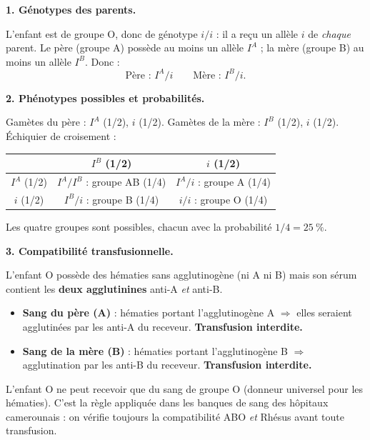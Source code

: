 \documentclass[11pt]{article}
\begin{document}
\begin{corrige}
\textbf{1. Génotypes des parents.}

L'enfant est de groupe O, donc de génotype $i/i$ : il a reçu un allèle $i$ de \emph{chaque} parent. Le père (groupe A) possède au moins un allèle $I^A$ ; la mère (groupe B) au moins un allèle $I^B$. Donc :
\[ \text{Père : } I^A/i \qquad \text{Mère : } I^B/i. \]

\textbf{2. Phénotypes possibles et probabilités.}

Gamètes du père : $I^A$ (1/2), $i$ (1/2). Gamètes de la mère : $I^B$ (1/2), $i$ (1/2). Échiquier de croisement :

\begin{center}
\begin{tabular}{|c|c|c|}\hline
\rowcolor{popblueL} & $I^B$ (1/2) & $i$ (1/2) \\ \hline
$I^A$ (1/2) & $I^A/I^B$ : groupe AB (1/4) & $I^A/i$ : groupe A (1/4) \\ \hline
$i$ (1/2) & $I^B/i$ : groupe B (1/4) & $i/i$ : groupe O (1/4) \\ \hline
\end{tabular}
\end{center}

Les quatre groupes sont possibles, chacun avec la probabilité $1/4 = \SI{25}{\percent}$.

\textbf{3. Compatibilité transfusionnelle.}

L'enfant O possède des hématies sans agglutinogène (ni A ni B) mais son sérum contient les \textbf{deux agglutinines} anti-A \emph{et} anti-B.
\begin{itemize}
    \item \textbf{Sang du père (A)} : hématies portant l'agglutinogène A $\Rightarrow$ elles seraient agglutinées par les anti-A du receveur. \textbf{Transfusion interdite.}
    \item \textbf{Sang de la mère (B)} : hématies portant l'agglutinogène B $\Rightarrow$ agglutination par les anti-B du receveur. \textbf{Transfusion interdite.}
\end{itemize}
L'enfant O ne peut recevoir que du sang de groupe O (donneur universel pour les hématies). C'est la règle appliquée dans les banques de sang des hôpitaux camerounais : on vérifie toujours la compatibilité ABO \emph{et} Rhésus avant toute transfusion.
\end{corrige}
\end{document}
